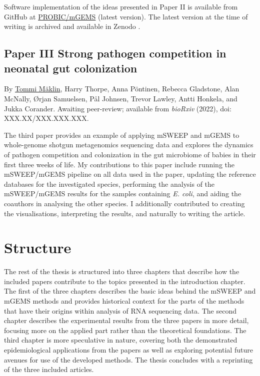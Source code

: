 \documentclass[officiallayout]{tktla}
\begin{document}
Software implementation of the ideas presented in Paper II is
available from GitHub at
\href{https://github.com/PROBIC/mGEMS}{PROBIC/mGEMS} (latest version).
The latest version at the time of writing is archived and available in
Zenodo \citep{maklin_mSWEEP}.

\subsection*{Paper III \textemdash Strong pathogen competition in neonatal gut colonization}
By \underline{Tommi Mäklin}, Harry Thorpe, Anna Pöntinen, Rebecca
Gladstone, Alan McNally, Ørjan Samuelsen, Pål Johnsen, Trevor Lawley,
Antti Honkela, and Jukka Corander. Awaiting peer-review; available
from \textit{bioRxiv} (2022), doi: XXX.XX/XXX.XXX.XXX.

The third paper provides an example of applying mSWEEP and mGEMS to
whole-genome shotgun metagenomics sequencing data and explores the
dynamics of pathogen competition and colonization in the gut
microbiome of babies in their first three weeks of life. My
contributions to this paper include running the mSWEEP/mGEMS pipeline
on all data used in the paper, updating the reference databases for
the investigated species, performing the analysis of the mSWEEP/mGEMS
results for the samples containing \textit{E. coli}, and aiding the
coauthors in analysing the other species. I additionally contributed
to creating the visualisations, interpreting the results, and
naturally to writing the article.

\section{Structure}

The rest of the thesis is structured into three chapters that describe
how the included papers contribute to the topics presented in the
introduction chapter. The first of the three chapters describes the
basic ideas behind the mSWEEP and mGEMS methods and provides
historical context for the parts of the methods that have their
origins within analysis of RNA sequencing data. The second chapter
describes the experimental results from the three papers in more
detail, focusing more on the applied part rather than the theoretical
foundations. The third chapter is more speculative in nature, covering
both the demonstrated epidemiological applications from the papers as
well as exploring potential future avenues for use of the developed
methods. The thesis concludes with a reprinting of the three included
articles.
\end{document}
